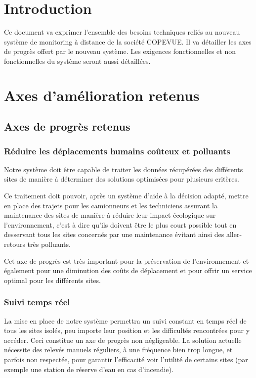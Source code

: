 \documentclass{mise_en_page}
\begin{document}
\maketitle

\tableofcontents

\newpage

\section{Introduction}
Ce document va exprimer l’ensemble des besoins techniques reliés au
nouveau système de monitoring à distance de la société COPEVUE. Il va
détailler les axes de progrès offert par le nouveau système. Les
exigences fonctionnelles et non fonctionnelles du système seront aussi
détaillées.

\section{Axes d’amélioration
retenus}
\subsection{Axes de progrès retenus}
\subsubsection{Réduire les déplacements humains coûteux et polluants}
Notre système doit être capable de traiter les données récupérées des
différents sites de manière à déterminer des solutions optimisées pour
plusieurs critères.

Ce traitement doit pouvoir, après un système d’aide à la décision
adapté, mettre en place des trajets pour les camionneurs et les
techniciens assurant la maintenance des sites de manière à réduire leur
impact écologique sur l’environnement, c’est à dire qu’ils doivent être
le plus court possible tout en desservant tous les sites concernés par
une maintenance évitant ainsi des aller-retours très polluants.

Cet axe de progrès est très important pour la préservation de
l’environnement et également pour une diminution des coûts de
déplacement et pour offrir un service optimal pour les différents
sites.

\subsubsection{Suivi temps réel}
La mise en place de notre système permettra un suivi constant en temps
réel de tous les sites isolés, peu importe leur position et les
difficultés rencontrées pour y accéder. Ceci constitue un axe de
progrès non négligeable. La solution actuelle nécessite des relevés
manuels réguliers, à une fréquence bien trop longue, et parfois non
respectée, pour garantir l’efficacité voir l’utilité de certains sites
(par exemple une station de réserve d’eau en cas d’incendie).
\end{document}
